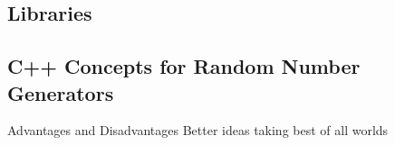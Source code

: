 \documentclass[crop=false]{standalone}
\begin{document}
    \subsection{Libraries} %
    \label{sub:libraries}


    \subsection{C++ Concepts for Random Number Generators} %
    \label{sub:c_concepts_for_random_number_generators}
      Advantages and Disadvantages
      Better ideas
      taking best of all worlds
\end{document}

